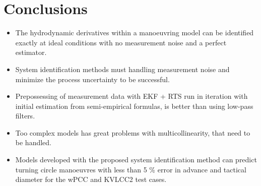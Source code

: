 \chapter{Conclusions\label{ch:conclusions}}

\begin{itemize}
    
    \item The hydrodynamic derivatives within a manoeuvring model can be identified exactly at ideal conditions with no measurement noise and a perfect estimator.
    
    \item System identification methods must handling measurement noise and minimize the process uncertainty to be successful.
    
    \item Prepossessing of measurement data with EKF + RTS run in iteration with initial estimation from semi-empirical formulas, is better than using low-pass filters.
    
    \item Too complex models has great problems with multicollinearity, that need to be handled.
    
    \item Models developed with the proposed system identification method can predict turning circle manoeuvres with less than 5 \% error in advance and tactical diameter for the wPCC and KVLCC2 test cases.
    
\end{itemize}

